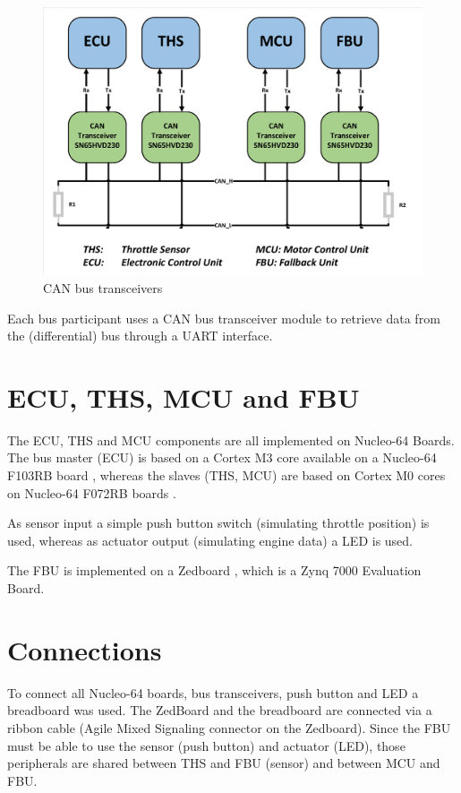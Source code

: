 \begin{figure}[h!]
    \centering
    \includegraphics[width=\textwidth]{figures/CANBus4.pdf}
    \caption{CAN bus transceivers}\label{fig:CANBus}
\end{figure}

Each bus participant uses a CAN bus transceiver module to retrieve data from the (differential) bus through a UART interface.

\section{ECU, THS, MCU and FBU}

The \gls{ECU}, \gls{THS} and \gls{MCU} components are all implemented on Nucleo-64 Boards. The bus master (\gls{ECU}) is based on a Cortex M3 core \cite{STM32F103RB} available on a Nucleo-64 F103RB board \cite{NucleoBoard}, whereas the slaves (\gls{THS}, \gls{MCU}) are based on Cortex M0 cores \cite{STM32F072RB} on Nucleo-64 F072RB boards \cite{NucleoBoard}.

As sensor input a simple push button switch (simulating throttle position) is used, whereas as actuator output (simulating engine data) a LED is used.

The \gls{FBU} is implemented on a Zedboard \cite{ZedBoard}, which is a Zynq 7000 Evaluation Board.

\section{Connections}

To connect all Nucleo-64 boards, bus transceivers, push button and LED a breadboard was used. The ZedBoard and the breadboard are connected via a ribbon cable (Agile Mixed Signaling connector on the Zedboard). 
Since the \gls{FBU} must be able to use the sensor (push button) and actuator (LED), those peripherals are shared between \gls{THS} and \gls{FBU} (sensor) and between \gls{MCU} and \gls{FBU}.